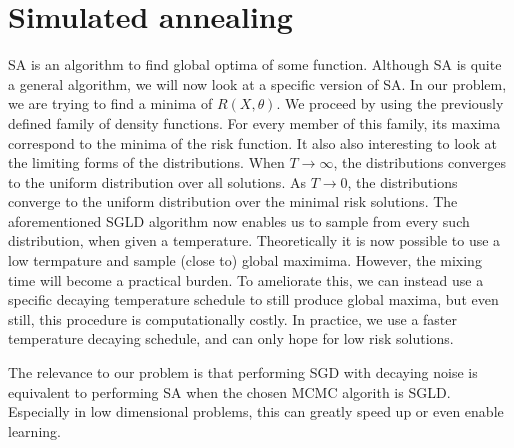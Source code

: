 \documentclass[twocolumn]{article}
\begin{document}
\section{Simulated annealing}
SA is an algorithm to find global optima of some function. Although SA is quite a general algorithm, we will now look at a specific version of SA. In our problem, we are trying to find a minima of $R(X, \theta)$. We proceed by using the previously defined family of density functions. For every member of this family, its maxima correspond to the minima of the risk function. It also also interesting to look at the limiting forms of the distributions. When $T\rightarrow \infty$, the distributions converges to the uniform distribution over all solutions. As $T \rightarrow 0$, the distributions converge to the uniform distribution over the minimal risk solutions. The aforementioned SGLD algorithm now enables us to sample from every such distribution, when given a temperature. Theoretically it is now possible to use a low termpature and sample (close to) global maximima. However, the mixing time will become a practical burden. To ameliorate this, we can instead use a specific decaying temperature schedule to still produce global maxima, but even still, this procedure is computationally costly. In practice, we use a faster temperature decaying schedule, and can only hope for low risk solutions.

The relevance to our problem is that performing SGD with decaying noise is equivalent to performing SA when the chosen MCMC algorith is SGLD. Especially in low dimensional problems, this can greatly speed up or even enable learning.
\end{document}
